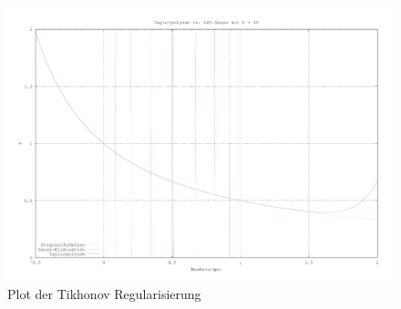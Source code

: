 \begin{figure}[H]
    \vspace{-1em}
    \begin{center}
        \includegraphics[width=\textwidth]{img/aufgabe5.pdf}
    \end{center}
    \vspace{-1em}
    \caption{Plot der Tikhonov Regularisierung}
    \label{fig:Tikonov}
\end{figure}